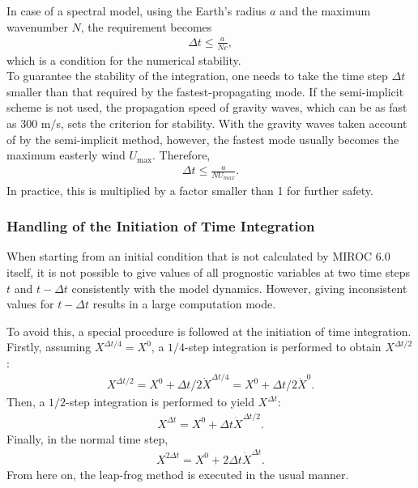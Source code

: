 In case of a spectral model, using the Earth's radius \(a\) and the maximum wavenumber \(N\), the requirement becomes \begin{eqnarray}
   \Delta t \le \frac{a}{N c},   \end{eqnarray} which is a condition for the numerical stability.\\
To guarantee the stability of the integration, one needs to take the time step \(\Delta t\) smaller than that required by the fastest-propagating mode. If the semi-implicit scheme is not used, the
propagation speed of gravity waves, which can be as fast as 300 m\(/\)s, sets the criterion for stability. With the gravity waves taken account of by the semi-implicit method, however, the fastest
mode usually becomes the maximum easterly wind \(U_{\mathrm{max}}\). Therefore, \begin{eqnarray}
   \Delta t \le \frac{a}{N U_{max}} .   \end{eqnarray} In practice, this is multiplied by a factor smaller than 1 for further safety.

\hypertarget{handling-of-the-initiation-of-time-integration}{%
\subsubsection{Handling of the Initiation of Time Integration}\label{handling-of-the-initiation-of-time-integration}}

When starting from an initial condition that is not calculated by MIROC 6.0 itself, it is not possible to give values of all prognostic variables at two time steps \(t\) and \(t-\Delta t\)
consistently with the model dynamics. However, giving inconsistent values for \(t-\Delta t\) results in a large computation mode.

To avoid this, a special procedure is followed at the initiation of time integration. Firstly, assuming \(X^{\Delta t/4} = X^0\), a \(1/4\)-step integration is performed to obtain \(X^{\Delta t/2}\):
\begin{eqnarray}
  X^{\Delta t/2} = X^0 + \Delta t/2 \dot{X}^{\Delta t/4}
                 = X^0 + \Delta t/2 \dot{X}^0.   \end{eqnarray} Then, a \(1/2\)-step integration is performed to yield \(X^{\Delta t}\): \begin{eqnarray}
  X^{\Delta t}   = X^0 + \Delta t \dot{X}^{\Delta t/2}.   \end{eqnarray} Finally, in the normal time step, \begin{eqnarray}
  X^{2\Delta t}   = X^0 + 2 \Delta t \dot{X}^{\Delta t}.   \end{eqnarray} From here on, the leap-frog method is executed in the usual manner.
